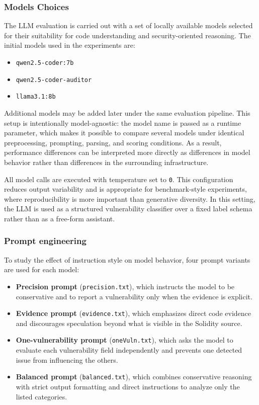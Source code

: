 \documentclass[a4paper,11pt]{article}\usepackage{graphicx} %
\begin{document}
\subsubsection{Models Choices}

The LLM evaluation is carried out with a set of locally available models selected for their suitability for code understanding and security-oriented reasoning. The initial models used in the experiments are:
\begin{itemize}
    \item \texttt{qwen2.5-coder:7b}\cite{noauthor_qwen25-coder_nodate}
    \item \texttt{qwen2.5-coder-auditor}\cite{noauthor_alpernaeqwen25-auditor_nodate}
    \item \texttt{llama3.1:8b}\cite{noauthor_llama31_nodate}
\end{itemize}

Additional models may be added later under the same evaluation pipeline. This setup is intentionally model-agnostic: the model name is passed as a runtime parameter, which makes it possible to compare several models under identical preprocessing, prompting, parsing, and scoring conditions. As a result, performance differences can be interpreted more directly as differences in model behavior rather than differences in the surrounding infrastructure.

All model calls are executed with temperature set to \texttt{0}. This configuration reduces output variability and is appropriate for benchmark-style experiments, where reproducibility is more important than generative diversity. In this setting, the LLM is used as a structured vulnerability classifier over a fixed label schema rather than as a free-form assistant.

\subsubsection{Prompt engineering}

To study the effect of instruction style on model behavior, four prompt variants are used for each model:
\begin{itemize}
    \item \textbf{Precision prompt} (\texttt{precision.txt}), which instructs the model to be conservative and to report a vulnerability only when the evidence is explicit.
    \item \textbf{Evidence prompt} (\texttt{evidence.txt}), which emphasizes direct code evidence and discourages speculation beyond what is visible in the Solidity source.
    \item \textbf{One-vulnerability prompt} (\texttt{oneVuln.txt}), which asks the model to evaluate each vulnerability field independently and prevents one detected issue from influencing the others.
    \item \textbf{Balanced prompt} (\texttt{balanced.txt}), which combines conservative reasoning with strict output formatting and direct instructions to analyze only the listed categories.
\end{itemize}
\end{document}
